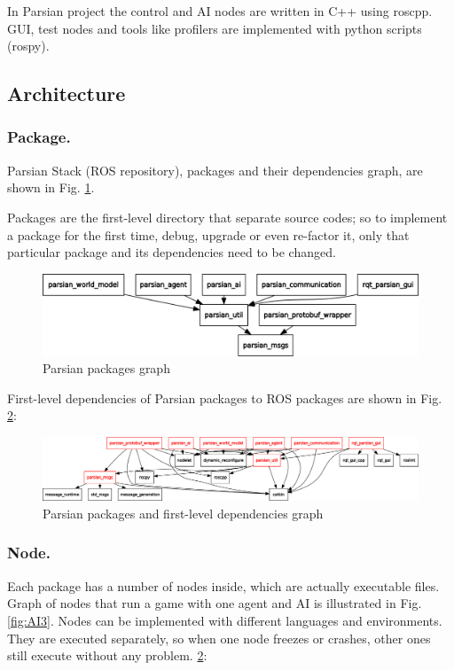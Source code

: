 \documentclass{llncs}
\begin{document}
In Parsian project the control and AI nodes are written in C++ using roscpp. GUI, test nodes and tools like profilers are implemented with python scripts (rospy).

\subsection{Architecture}
\label{subsec:Architecture}
\subsubsection{Package.}
\label{subsubsec:Package}
Parsian Stack (ROS repository), packages and their dependencies graph, are shown in  Fig. \ref{fig:AI1}.

Packages are the first-level directory that separate source codes; so to implement a package for the first time, debug, upgrade or even re-factor it, only that particular package and its dependencies need to be changed.

\begin{figure}
\includegraphics[width=\textwidth]{img/ai1}
\caption{Parsian packages graph}
\label{fig:AI1}
\end{figure}

First-level dependencies of Parsian packages to ROS packages are shown in Fig. \ref{fig:AI2}:
\begin{figure}
\includegraphics[width=\textwidth]{img/ai2}
\caption{Parsian packages and first-level dependencies graph}
\label{fig:AI2}
\end{figure}

\subsubsection{Node.}
\label{subsubsec:Node}
Each package has a number of nodes inside, which are actually executable files. Graph of nodes that run a game with one agent and AI is illustrated in Fig. \ref{fig:AI3}.
Nodes can be implemented with different languages and environments. They are executed separately, so when one node freezes or crashes, other ones still execute without any problem.
\ref{fig:AI2}:
\end{document}
